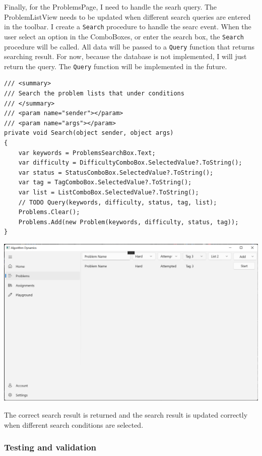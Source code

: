 \documentclass[a4paper]{report}
\newcommand{\code}{\texttt}
\begin{document}
Finally, for the ProblemsPage, I need to handle the searh query. The ProblemListView needs to be updated when different search queries are entered in the toolbar. I create a \code{Search} procedure to handle the searc event. When the user select an option in the ComboBoxes, or enter the search box, the \code{Search} procedure will be called. All data will be passed to a \code{Query} function that returns searching result. For now, because the database is not implemented, I will just return the query. The \code{Query} function will be implemented in the future.

\begin{verbatim}
/// <summary>
/// Search the problem lists that under conditions
/// </summary>
/// <param name="sender"></param>
/// <param name="args"></param>
private void Search(object sender, object args)
{
    var keywords = ProblemsSearchBox.Text;
    var difficulty = DifficultyComboBox.SelectedValue?.ToString();
    var status = StatusComboBox.SelectedValue?.ToString();
    var tag = TagComboBox.SelectedValue?.ToString();
    var list = ListComboBox.SelectedValue?.ToString();
    // TODO Query(keywords, difficulty, status, tag, list);
    Problems.Clear();
    Problems.Add(new Problem(keywords, difficulty, status, tag));
}
\end{verbatim}

\includegraphics[width=\textwidth, height=\textheight, keepaspectratio]{ProblemsPage-Search}

The correct search result is returned and the search result is updated correctly when different search conditions are selected.

\subsubsection{Testing and validation}
\end{document}
